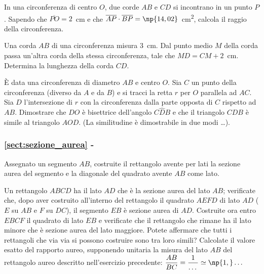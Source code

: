 \begin{esercizio}
\label{ese:6.104}
In una circonferenza di centro \(O\), due corde \(AB\) e \(CD\) si 
incontrano in un punto \(P\). Sapendo che \(\overline{PO}=2\)~cm e che 
\(\overline{AP}\cdot \overline{BP}=\np{14,02}\)~cm\textsuperscript{2}, 
calcola il raggio della circonferenza.
\end{esercizio}

\begin{esercizio}
\label{ese:6.105}
Una corda \(AB\) di una circonferenza misura 3~cm. Dal punto medio \(M\) 
della corda passa un'altra corda della stessa circonferenza, tale che 
\(MD=CM+2\)~cm. Determina la lunghezza della corda \(CD\).
\end{esercizio}

\begin{esercizio}
\label{ese:6.106}
\`E data una circonferenza di diametro \(AB\) e centro \(O\). Sia \(C\) un 
punto della circonferenza (diverso da \(A\) e da \(B\)) e si tracci la 
retta \(r\) per \(O\) parallela ad \(AC\). Sia \(D\) l'intersezione di \(r\) 
con la circonferenza dalla parte opposta di \(C\) rispetto ad \(AB\). 
Dimostrare che \(DO\) è bisettrice dell'angolo \(C\widehat{D}B\) e che il 
triangolo \(CDB\) è simile al triangolo \(AOD\). (La similitudine è 
dimostrabile in due modi \ldots{}).
\end{esercizio}

\begingroup
\hypersetup{linkcolor=black}
\subsubsection*{\ref{sect:sezione_aurea} - 
}
\endgroup

\begin{esercizio}
\label{ese:6.107}
Assegnato un segmento \(AB\), costruite il rettangolo avente per lati 
la sezione aurea del segmento e la diagonale del quadrato avente \(AB\) 
come lato.
\end{esercizio}

\begin{esercizio}
\label{ese:6.108}
Un rettangolo \(ABCD\) ha il lato \(AD\) che è la sezione aurea del lato 
\(AB\); verificate che, dopo aver costruito all'interno del rettangolo 
il quadrato \(AEFD\) di lato \(AD\) (\(E\) su \(AB\) e \(F\) su \(DC\)), il 
segmento \(EB\) è sezione aurea di \(AD\). Costruite ora entro \(EBCF\) il 
quadrato di lato \(EB\) e verificate che il rettangolo che rimane ha il 
lato minore che è sezione aurea del lato maggiore. Potete affermare 
che tutti i rettangoli che via via si possono costruire sono tra loro 
simili? Calcolate il valore esatto del rapporto aureo, supponendo 
unitaria la misura del lato \(AB\) del rettangolo aureo descritto 
nell'esercizio precedente: \(\dfrac{AB}{BC}=\dfrac{1}{\ldots{}}\simeq 
\np{1,}\ldots{}\)
\end{esercizio}

